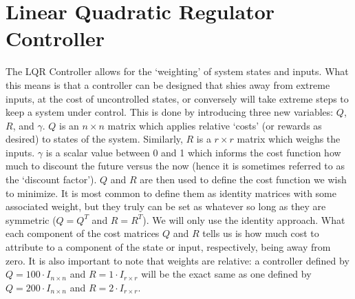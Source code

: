 \FloatBarrier\section{Linear Quadratic Regulator Controller} %
The \ac{LQR} Controller allows for the `weighting' of system states and inputs. What this means is that a controller can be designed that shies away from extreme inputs, at the cost of uncontrolled states, or conversely will take extreme steps to keep a system under control.
This is done by introducing three new variables: $Q$, $R$, and $\gamma$. $Q$ is an $n\times n$ matrix which applies relative `costs' (or rewards as desired) to states of the system. Similarly, $R$ is a $r\times r$ matrix which weighs the inputs. $\gamma$ is a scalar value between 0 and 1 which informs the cost function how much to discount the future versus the now (hence it is sometimes referred to as the `discount factor'). 
$Q$ and $R$ are then used to define the cost function we wish to minimize. It is most common to define them as identity matrices with some associated weight, but they truly can be set as whatever so long as they are symmetric ($Q=Q^T$ and $R=R^T$). We will only use the identity approach. What each component of the cost matrices $Q$ and $R$ tells us is how much cost to attribute to a component of the state or input, respectively, being away from zero. It is also important to note that weights are relative: a controller defined by $Q=100\cdot I_{n\times n}$ and $R=1\cdot I_{r\times r}$ will be the exact same as one defined by $Q=200\cdot I_{n\times n}$ and $R=2\cdot I_{r\times r}$.


